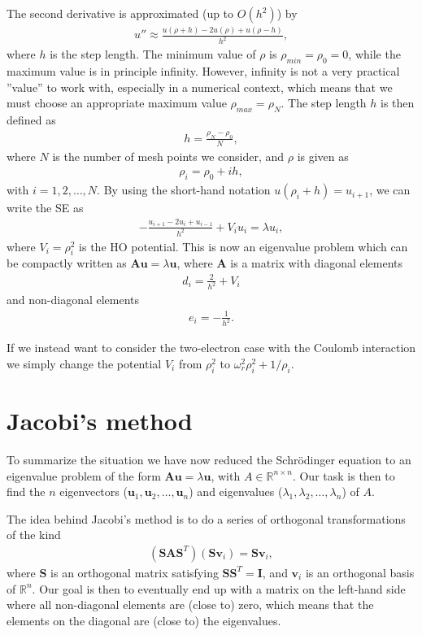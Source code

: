 \documentclass[12pt, a4paper]{article}
\begin{document}
The second derivative is approximated (up to $O(h^2)$) by 
\begin{align*}
u'' \approx \frac{u(\rho + h) - 2u(\rho) + u(\rho - h)}{h^2},  
\end{align*}
where $h$ is the step length. The minimum value of $\rho$ is $\rho_{min} = \rho_0 = 0$, while the 
maximum value is in principle infinity. However, infinity is not a very practical ''value'' to work with,
especially in a numerical context, which means that we must choose an appropriate maximum value 
$\rho_{max} = \rho_N$. The step length $h$ is then defined as 
\begin{align*}
h = \frac{\rho_N - \rho_0}{N}, 
\end{align*} 
where $N$ is the number of mesh points we consider, and $\rho$ is given as 
\begin{align*}
\rho_i = \rho_0 + ih, 
\end{align*}
with $i = 1,2,\dots,N$. By using the short-hand notation $u(\rho_i + h) = u_{i+1}$, we can write the 
SE as 
\begin{align}
- \frac{u_{i+1} - 2u_i + u_{i-1}}{h^2} + V_iu_i = \lambda u_i, 
\end{align}
where $V_i = \rho_i^2$ is the HO potential. This is now an eigenvalue problem which can be compactly 
written as $\mathbf{Au} = \lambda\mathbf{u}$, where $\mathbf{A}$ is a matrix with diagonal elements 
\begin{align*}
d_i = \frac{2}{h^2} + V_i
\end{align*}
and non-diagonal elements 
\begin{align*}
e_i = -\frac{1}{h^2}. 
\end{align*} 

If we instead want to consider the two-electron case with the Coulomb interaction we simply change 
the potential $V_i$ from $\rho_i^2$ to $\omega_r^2\rho_i^2 + 1/\rho_i$. 

\section{Jacobi's method}

To summarize the situation we have now reduced the Schrödinger equation to an eigenvalue problem of 
the form $\mathbf{Au} = \lambda\mathbf{u}$, with $A\in \mathbb{R}^{n\times n}$. Our task is then to find 
the $n$ eigenvectors ($\mathbf{u}_1, \mathbf{u}_2,\dots,\mathbf{u}_n$) and eigenvalues 
($\lambda_1,\lambda_2,\dots,\lambda_n$) of $A$. 

The idea behind Jacobi's method is to do a series of orthogonal transformations of the kind 
\begin{align*}
(\mathbf{SAS}^T)(\mathbf{Sv}_i) = \mathbf{Sv}_i, 
\end{align*}
where $\mathbf{S}$ is an orthogonal matrix satisfying $\mathbf{SS}^T = \mathbf{I}$, and $\mathbf{v}_i$ is 
an orthogonal basis of $\mathbb{R}^n$. Our goal is then to eventually end up with a matrix on the 
left-hand side where all non-diagonal elements are (close to) zero, which means that the elements on the 
diagonal are (close to) the eigenvalues. 
\end{document}
